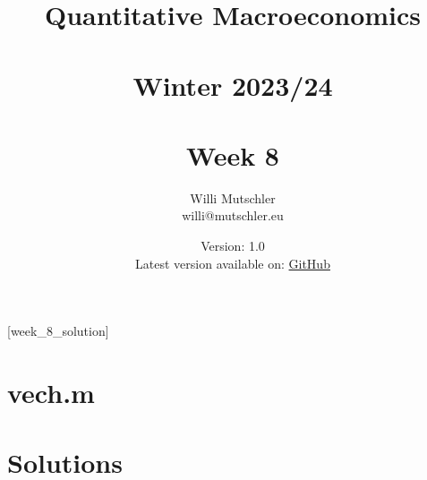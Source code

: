 
\newif\ifDisplaySolutions\DisplaySolutionstrue


\title{Quantitative Macroeconomics\\~\\Winter 2023/24\\~\\Week 8}
\author{Willi Mutschler\\willi@mutschler.eu}
\date{Version: 1.0\\Latest version available on: \href{https://github.com/wmutschl/Quantitative-Macroeconomics/releases/latest/download/week_8.pdf}{GitHub}}
\maketitle\thispagestyle{empty}

\newpage
{}[week_8_solution]
\tableofcontents\thispagestyle{empty}\newpage

\setcounter{page}{1}
\newpage
\newpage
\newpage
\newpage

\printbibliography
\appendix
\section{vech.m}



\ifDisplaySolutions
\newpage
\appendix
\section{Solutions}

\fi
